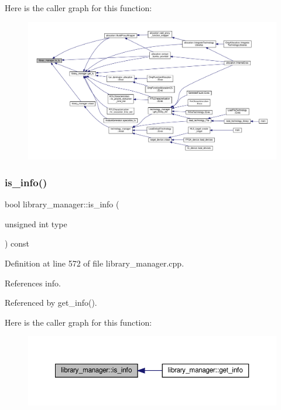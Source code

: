 Here is the caller graph for this function\+:
\nopagebreak
\begin{figure}[H]
\begin{center}
\leavevmode
\includegraphics[width=350pt]{d8/d35/classlibrary__manager_a8b79f093ebc0949d2e87ba84e185a361_icgraph}
\end{center}
\end{figure}
\mbox{\label{classlibrary__manager_a926d994ff986bfee4adf363c88ce5acf}} 
\subsubsection{\texorpdfstring{is\+\_\+info()}{is\_info()}}
{\footnotesize\ttfamily bool library\+\_\+manager\+::is\+\_\+info (\begin{DoxyParamCaption}\item[{unsigned int}]{type }\end{DoxyParamCaption}) const}



Definition at line 572 of file library\+\_\+manager.\+cpp.



References info.



Referenced by get\+\_\+info().

Here is the caller graph for this function\+:
\nopagebreak
\begin{figure}[H]
\begin{center}
\leavevmode
\includegraphics[width=350pt]{d8/d35/classlibrary__manager_a926d994ff986bfee4adf363c88ce5acf_icgraph}
\end{center}
\end{figure}
\mbox{\label{classlibrary__manager_a3622c3c263ac844696f221967db3af38}} 
